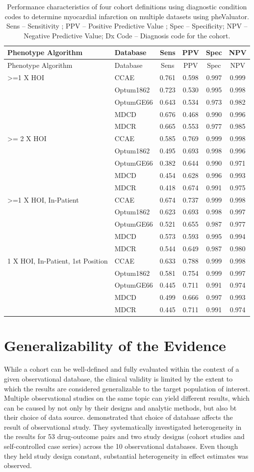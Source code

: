 \documentclass[11pt]{book}
\theoremstyle{definition}
\theoremstyle{definition}
\theoremstyle{definition}
\theoremstyle{remark}
\begin{document}
\begin{longtable}[]{@{}llcccc@{}}
\caption{\label{tab:phevalStats} Performance characteristics of four cohort
definitions using diagnostic condition codes to determine myocardial
infarction on multiple datasets using pheValuator. Sens -- Sensitivity ;
PPV -- Positive Predictive Value ; Spec -- Specificity; NPV -- Negative
Predictive Value; Dx Code -- Diagnosis code for the
cohort.}\tabularnewline
\toprule
Phenotype Algorithm & Database & Sens & PPV & Spec & NPV\tabularnewline
\midrule
\endfirsthead
\toprule
Phenotype Algorithm & Database & Sens & PPV & Spec & NPV\tabularnewline
\midrule
\endhead
\textgreater{}=1 X HOI & CCAE & 0.761 & 0.598 & 0.997 &
0.999\tabularnewline
& Optum1862 & 0.723 & 0.530 & 0.995 & 0.998\tabularnewline
& OptumGE66 & 0.643 & 0.534 & 0.973 & 0.982\tabularnewline
& MDCD & 0.676 & 0.468 & 0.990 & 0.996\tabularnewline
& MDCR & 0.665 & 0.553 & 0.977 & 0.985\tabularnewline
\textgreater{}= 2 X HOI & CCAE & 0.585 & 0.769 & 0.999 &
0.998\tabularnewline
& Optum1862 & 0.495 & 0.693 & 0.998 & 0.996\tabularnewline
& OptumGE66 & 0.382 & 0.644 & 0.990 & 0.971\tabularnewline
& MDCD & 0.454 & 0.628 & 0.996 & 0.993\tabularnewline
& MDCR & 0.418 & 0.674 & 0.991 & 0.975\tabularnewline
\textgreater{}=1 X HOI, In-Patient & CCAE & 0.674 & 0.737 & 0.999 &
0.998\tabularnewline
& Optum1862 & 0.623 & 0.693 & 0.998 & 0.997\tabularnewline
& OptumGE66 & 0.521 & 0.655 & 0.987 & 0.977\tabularnewline
& MDCD & 0.573 & 0.593 & 0.995 & 0.994\tabularnewline
& MDCR & 0.544 & 0.649 & 0.987 & 0.980\tabularnewline
1 X HOI, In-Patient, 1st Position & CCAE & 0.633 & 0.788 & 0.999 &
0.998\tabularnewline
& Optum1862 & 0.581 & 0.754 & 0.999 & 0.997\tabularnewline
& OptumGE66 & 0.445 & 0.711 & 0.991 & 0.974\tabularnewline
& MDCD & 0.499 & 0.666 & 0.997 & 0.993\tabularnewline
& MDCR & 0.445 & 0.711 & 0.991 & 0.974\tabularnewline
\bottomrule
\end{longtable}

\section{Generalizability of the
Evidence}\label{GeneralizabilityOfEvidence}

While a cohort can be well-defined and fully evaluated within the
context of a given observational database, the clinical validity is
limited by the extent to which the results are considered generalizable
to the target population of interest. Multiple observational studies on
the same topic can yield different results, which can be caused by not
only by their designs and analytic methods, but also bt their choice of
data source. \citet{madigan_2013} demonstrated that choice of database
affects the result of observational study. They systematically
investigated heterogeneity in the results for 53 drug-outcome pairs and
two study designs (cohort studies and self-controlled case series)
across the 10 observational databases. Even though they held study
design constant, substantial heterogeneity in effect estimates was
observed.
\end{document}
